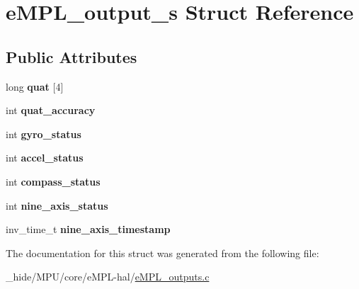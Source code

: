 \hypertarget{structe_m_p_l__output__s}{}\section{e\+M\+P\+L\+\_\+output\+\_\+s Struct Reference}
\label{structe_m_p_l__output__s}
\subsection*{Public Attributes}
\begin{DoxyCompactItemize}
\item 
\hypertarget{structe_m_p_l__output__s_a02cadf1fc323a7760950c57238dcc1c8}{}long {\bfseries quat} \mbox{[}4\mbox{]}\label{structe_m_p_l__output__s_a02cadf1fc323a7760950c57238dcc1c8}

\item 
\hypertarget{structe_m_p_l__output__s_ad43e1dd3eab6a2c63d85688f41ec8c9b}{}int {\bfseries quat\+\_\+accuracy}\label{structe_m_p_l__output__s_ad43e1dd3eab6a2c63d85688f41ec8c9b}

\item 
\hypertarget{structe_m_p_l__output__s_ade53d7d6fce692b74829384440a481de}{}int {\bfseries gyro\+\_\+status}\label{structe_m_p_l__output__s_ade53d7d6fce692b74829384440a481de}

\item 
\hypertarget{structe_m_p_l__output__s_a0ee7adfe0960dd0d8f23b4b538732ed3}{}int {\bfseries accel\+\_\+status}\label{structe_m_p_l__output__s_a0ee7adfe0960dd0d8f23b4b538732ed3}

\item 
\hypertarget{structe_m_p_l__output__s_a2b974160709bb876241509e7e14c11c2}{}int {\bfseries compass\+\_\+status}\label{structe_m_p_l__output__s_a2b974160709bb876241509e7e14c11c2}

\item 
\hypertarget{structe_m_p_l__output__s_a3a511c910ccc4a48ad1cc8ae2b795488}{}int {\bfseries nine\+\_\+axis\+\_\+status}\label{structe_m_p_l__output__s_a3a511c910ccc4a48ad1cc8ae2b795488}

\item 
\hypertarget{structe_m_p_l__output__s_a4927059e368cc9c3c4508354541fe86b}{}inv\+\_\+time\+\_\+t {\bfseries nine\+\_\+axis\+\_\+timestamp}\label{structe_m_p_l__output__s_a4927059e368cc9c3c4508354541fe86b}

\end{DoxyCompactItemize}


The documentation for this struct was generated from the following file\+:\begin{DoxyCompactItemize}
\item 
\+\_\+hide/\+M\+P\+U/core/e\+M\+P\+L-\/hal/\hyperlink{e_m_p_l__outputs_8c}{e\+M\+P\+L\+\_\+outputs.\+c}\end{DoxyCompactItemize}
